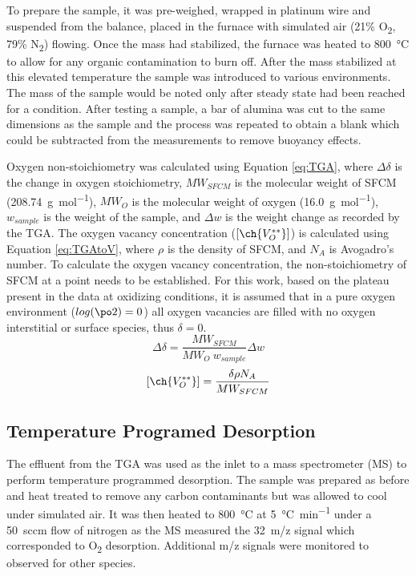         To prepare the sample, it was pre-weighed, wrapped in platinum wire and suspended from the balance, placed in the furnace with simulated air (21\% O\textsubscript{2}, 79\% N\textsubscript{2}) flowing.
        Once the mass had stabilized, the furnace was heated to \SI{800}{\celsius} to allow for any organic contamination to burn off.
        After the mass stabilized at this elevated temperature the sample was introduced to various environments.
        The mass of the sample would be noted only after steady state had been reached for a condition.
        After testing a sample, a bar of alumina was cut to the same dimensions as the sample and the process was repeated to obtain a blank which could be subtracted from the measurements to remove buoyancy effects.

        Oxygen non-stoichiometry was calculated using Equation \ref{eq:TGA}, where $\Delta\delta$ is the change in oxygen stoichiometry, $MW_{SFCM}$ is the molecular weight of SFCM (\SI{208.74}{\gram\per\mol}), $MW_O$ is the molecular weight of oxygen (\SI{16.0}{\gram\per\mol}), $w_{sample}$ is the weight of the sample, and $\Delta{}w$ is the weight change as recorded by the TGA.
        The oxygen vacancy concentration ($\lbrack\ch{V_O^{**}}\rbrack$) is calculated using Equation \ref{eq:TGAtoV}, where $\rho$ is the density of SFCM, and $N_A$ is Avogadro's number.
        To calculate the oxygen vacancy concentration, the non-stoichiometry of SFCM at a point needs to be established.
        For this work, based on the plateau present in the data at oxidizing conditions, it is assumed that in a pure oxygen environment ($log(\po2{})=0$) all oxygen vacancies are filled with no oxygen interstitial or surface species, thus $\delta=0$.
        \begin{equation}
            \Delta\delta = \frac{MW_{SFCM}}{MW_O\ w_{sample}}\Delta{}w
            \label{eq:TGA}
        \end{equation}
        \begin{equation}
            \lbrack\ch{V_O^{**}}\rbrack =\frac{\delta\rho{}N_A}{MW_{SFCM}}
            \label{eq:TGAtoV}
        \end{equation}

    \subsection{Temperature Programed Desorption}
        The effluent from the TGA was used as the inlet to a mass spectrometer (MS) to perform temperature programmed desorption.
        The sample was prepared as before and heat treated to remove any carbon contaminants but was allowed to cool under simulated air.
        It was then heated to \SI{800}{\celsius} at \SI{5}{\celsius\per\minute} under a \SI{50}{sccm} flow of nitrogen as the MS measured the \SI{32}{m/z} signal which corresponded to O\textsubscript{2} desorption.
        Additional m/z signals were monitored to observed for other species.

